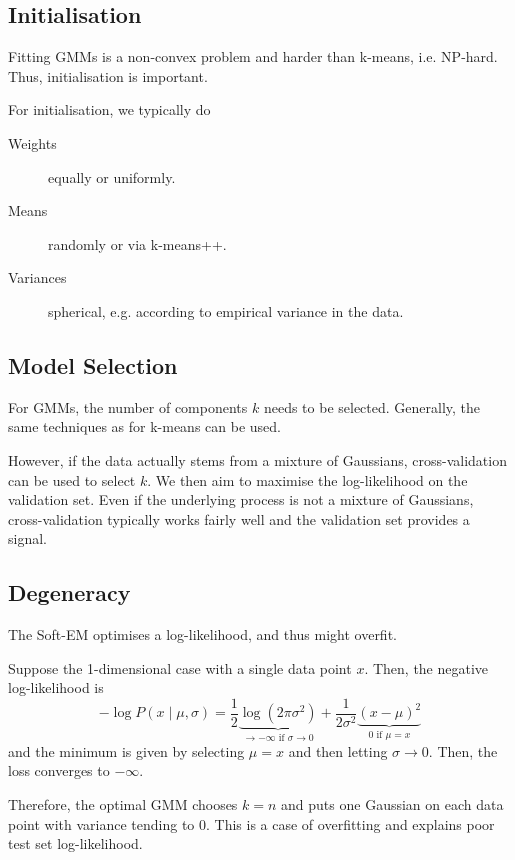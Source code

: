 \subsection{Initialisation}
Fitting GMMs is a non-convex problem
and harder than k-means, i.e. NP-hard.
Thus, initialisation is important.

For initialisation, we typically do
\begin{description}
	\item[Weights] equally or uniformly.
	\item[Means] randomly or via k-means++.
	\item[Variances] spherical,
	e.g. according to empirical variance in the data.
\end{description}


\subsection{Model Selection}
For GMMs, the number of components $k$ needs to be selected.
Generally, the same techniques as for k-means can be used.

However, if the data actually stems from a mixture of Gaussians,
cross-validation can be used to select $k$.
We then aim to maximise the log-likelihood on the validation set.
Even if the underlying process is not a mixture of Gaussians,
cross-validation typically works fairly well
and the validation set provides a signal.


\subsection{Degeneracy}
The Soft-EM optimises a log-likelihood,
and thus might overfit.

Suppose the 1-dimensional case with a single data point $x$.
Then, the negative log-likelihood is
\begin{equation*}
-\log{P(x \mid \mu, \sigma)} =
\frac{1}{2}
\underbrace{\log{(2 \pi \sigma^2)}}_\text{$\to -\infty$ if $\sigma \to 0$}
+
\frac{1}{2 \sigma^2}
\underbrace{(x - \mu)^2}_\text{$0$ if $\mu = x$}
\end{equation*}
and the minimum is given by selecting $\mu = x$ and
then letting $\sigma \to 0$.
Then, the loss converges to $-\infty$.

Therefore, the optimal GMM chooses $k=n$ and
puts one Gaussian on each data point with variance
tending to $0$.
This is a case of overfitting and explains poor test set
log-likelihood.

